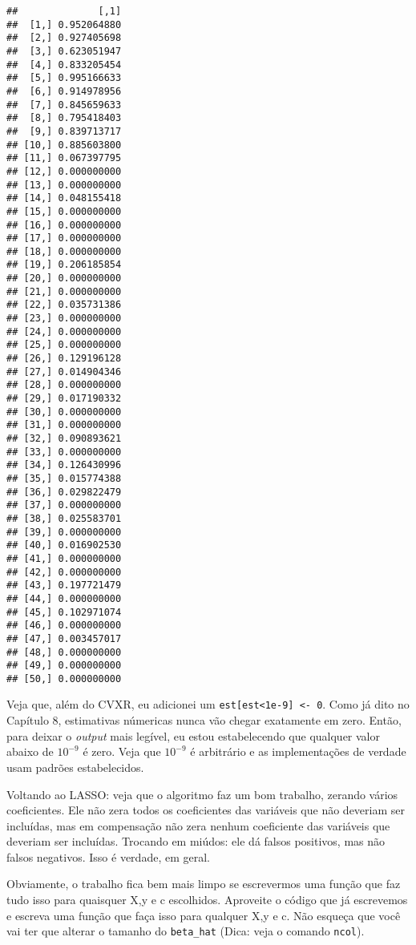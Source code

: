 \documentclass[]{book}
\begin{document}
\begin{verbatim}
##              [,1]
##  [1,] 0.952064880
##  [2,] 0.927405698
##  [3,] 0.623051947
##  [4,] 0.833205454
##  [5,] 0.995166633
##  [6,] 0.914978956
##  [7,] 0.845659633
##  [8,] 0.795418403
##  [9,] 0.839713717
## [10,] 0.885603800
## [11,] 0.067397795
## [12,] 0.000000000
## [13,] 0.000000000
## [14,] 0.048155418
## [15,] 0.000000000
## [16,] 0.000000000
## [17,] 0.000000000
## [18,] 0.000000000
## [19,] 0.206185854
## [20,] 0.000000000
## [21,] 0.000000000
## [22,] 0.035731386
## [23,] 0.000000000
## [24,] 0.000000000
## [25,] 0.000000000
## [26,] 0.129196128
## [27,] 0.014904346
## [28,] 0.000000000
## [29,] 0.017190332
## [30,] 0.000000000
## [31,] 0.000000000
## [32,] 0.090893621
## [33,] 0.000000000
## [34,] 0.126430996
## [35,] 0.015774388
## [36,] 0.029822479
## [37,] 0.000000000
## [38,] 0.025583701
## [39,] 0.000000000
## [40,] 0.016902530
## [41,] 0.000000000
## [42,] 0.000000000
## [43,] 0.197721479
## [44,] 0.000000000
## [45,] 0.102971074
## [46,] 0.000000000
## [47,] 0.003457017
## [48,] 0.000000000
## [49,] 0.000000000
## [50,] 0.000000000
\end{verbatim}

Veja que, além do CVXR, eu adicionei um
\texttt{est{[}est\textless{}1e-9{]}\ \textless{}-\ 0}. Como já dito no
Capítulo 8, estimativas númericas nunca vão chegar exatamente em zero.
Então, para deixar o \emph{output} mais legível, eu estou estabelecendo
que qualquer valor abaixo de \(10^{-9}\) é zero. Veja que \(10^{-9}\) é
arbitrário e as implementações de verdade usam padrões estabelecidos.

Voltando ao LASSO: veja que o algoritmo faz um bom trabalho, zerando
vários coeficientes. Ele não zera todos os coeficientes das variáveis
que não deveriam ser incluídas, mas em compensação não zera nenhum
coeficiente das variáveis que deveriam ser incluídas. Trocando em
miúdos: ele dá falsos positivos, mas não falsos negativos. Isso é
verdade, em geral.

Obviamente, o trabalho fica bem mais limpo se escrevermos uma função que
faz tudo isso para quaisquer X,y e c escolhidos. Aproveite o código que
já escrevemos e escreva uma função que faça isso para qualquer X,y e c.
Não esqueça que você vai ter que alterar o tamanho do \texttt{beta\_hat}
(Dica: veja o comando \texttt{ncol}).
\end{document}
